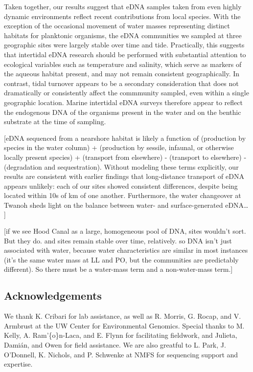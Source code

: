 \documentclass[fleqn,10pt,lineno]{wlpeerj} %
\begin{document}
Taken together, our results suggest that eDNA samples taken from even
highly dynamic environments reflect recent contributions from local
species. With the exception of the occasional movement of water masses
representing distinct habitats for planktonic organisms, the eDNA
communities we sampled at three geographic sites were largely stable
over time and tide. Practically, this suggests that intertidal eDNA
research should be performed with substantial attention to ecological
variables such as temperature and salinity, which serve as markers of
the aqueous habitat present, and may not remain consistent
geographically. In contrast, tidal turnover appears to be a secondary
consideration that does not dramatically or consistently affect the
commmunity sampled, even within a single geographic location. Marine
intertidal eDNA surveys therefore appear to reflect the endogenous DNA
of the organisms present in the water and on the benthic substrate at
the time of sampling.

{[}eDNA sequenced from a nearshore habitat is likely a function of
(production by species in the water column) + (production by sessile,
infaunal, or otherwise locally present species) + (transport from
elsewhere) - (transport to elsewhere) - (degradation and sequestration).
Without modeling these terms explicitly, our results are consistent with
earlier findings that long-distance transport of eDNA appears unlikely:
each of our sites showed consistent differences, despite being located
within 10s of km of one another. Furthermore, the water changeover at
Twanoh sheds light on the balance between water- and surface-generated
eDNA\ldots{} {]}

{[}if we see Hood Canal as a large, homogeneous pool of DNA, sites
wouldn't sort. But they do. and sites remain stable over time,
relatively. so DNA isn't just associated with water, because water
characteristics are similar in most instances (it's the same water mass
at LL and PO, but the communities are predictably different). So there
must be a water-mass term and a non-water-mass term.{]}

\subsection{Acknowledgements}\label{acknowledgements}

We thank K. Cribari for lab assistance, as well as R. Morris, G. Rocap,
and V. Armbrust at the UW Center for Environmental Genomics. Special
thanks to M. Kelly, A. Ram'\{o\}n-Laca, and E. Flynn for facilitating
fieldwork, and Julieta, Damián, and Owen for field assistance. We are
also greatful to L. Park, J. O'Donnell, K. Nichols, and P. Schwenke at
NMFS for sequencing support and expertise.
\end{document}

